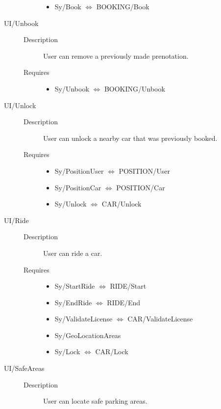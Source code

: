 \documentclass[11pt]{article} %
\begin{document}
\begin{description}
\begin{description}
\begin{itemize}
			\item Sy/Book $\Leftrightarrow$ BOOKING/Book
		\end{itemize}
	\end{description}
	\item[UI/Unbook] \hfill
	\begin{description}
		\item[Description] User can remove a previously made prenotation.
		\item[Requires] \hfill
		\begin{itemize}
			\item Sy/Unbook $\Leftrightarrow$ BOOKING/Unbook
		\end{itemize}
	\end{description}
	\item[UI/Unlock] \hfill
	\begin{description}
		\item[Description] User can unlock a nearby car that was previously booked.
		\item[Requires] \hfill
		\begin{itemize}
			\item Sy/PositionUser $\Leftrightarrow$ POSITION/User
			\item Sy/PositionCar $\Leftrightarrow$ POSITION/Car
			\item Sy/Unlock $\Leftrightarrow$ CAR/Unlock
		\end{itemize}
	\end{description}
	\item[UI/Ride] \hfill
	\begin{description}
		\item[Description] User can ride a car.
		\item[Requires] \hfill
		\begin{itemize}
			\item Sy/StartRide $\Leftrightarrow$ RIDE/Start
			\item Sy/EndRide $\Leftrightarrow$ RIDE/End
			\item Sy/ValidateLicense $\Leftrightarrow$ CAR/ValidateLicense
			\item Sy/GeoLocationAreas
			\item Sy/Lock $\Leftrightarrow$ CAR/Lock
		\end{itemize}
	\end{description}
	\item[UI/SafeAreas] \hfill
	\begin{description}
		\item[Description] User can locate safe parking areas.

\end{description}
\end{description}
\end{document}
